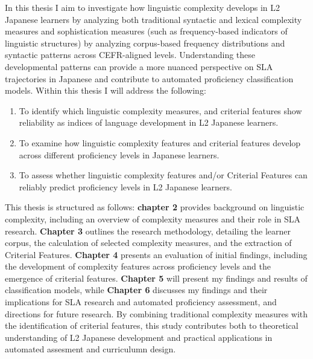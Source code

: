 In this thesis I aim to  investigate how linguistic complexity develops in L2 Japanese learners by analyzing
both traditional syntactic and lexical complexity measures and sophistication measures (such as frequency-based
indicators of linguistic structures) by analyzing corpus-based frequency distributions and syntactic patterns across CEFR-aligned levels. Understanding these developmental patterns can provide a more nuanced
perspective on SLA trajectories in Japanese and contribute to automated proficiency classification models. Within
this thesis I will address the following:
\begin{enumerate}
    \item To identify which linguistic complexity measures, and criterial features show reliability as indices of
    language development in
    L2 Japanese learners.
    \item To examine how linguistic complexity features and criterial features develop across different proficiency
    levels in Japanese
    learners.
    \item To assess whether linguistic complexity features and/or Criterial Features can reliably predict proficiency
    levels in L2 Japanese
    learners.
\end{enumerate}

This thesis is structured as follows: \textbf{chapter 2} provides background on linguistic complexity, including an
overview of complexity measures and their role in SLA research.
\textbf{Chapter 3} outlines the research methodology, detailing the learner corpus, the calculation of selected
complexity measures, and the extraction of Criterial Features.
 \textbf{Chapter 4} presents an evaluation of initial findings, including the development of complexity features across proficiency levels and the emergence of criterial features.
\textbf{Chapter 5 }will present my findings and results of classification models, while \textbf{Chapter 6}
discusses my findings and their implications for SLA research and automated proficiency assessment, and directions for
future research. By combining traditional complexity measures with the identification of criterial features, this
study contributes both to theoretical understanding of L2 Japanese development and practical applications in
automated assesment and curriculumn design. %